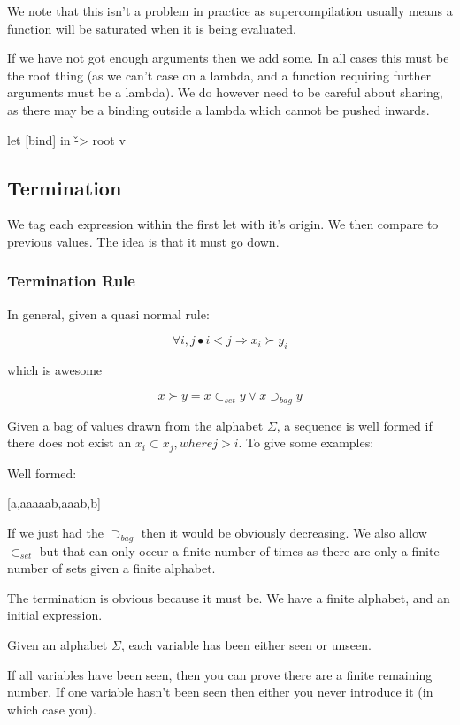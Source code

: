 \documentclass{sigplanconf}
\begin{document}
We note that this isn't a problem in practice as supercompilation usually means a function will be saturated when it is being evaluated.


If we have not got enough arguments then we add some. In all cases this must be the root thing (as we can't case on a lambda, and a function requiring further arguments must be a lambda). We do however need to be careful about sharing, as there may be a binding outside a lambda which cannot be pushed inwards.

\begin{code}
let [bind]
in \v -> root v
\end{code}


\subsection{Termination}
\label{sec:term}

We tag each expression within the first let with it's origin. We then compare to previous values. The idea is that it must go down.

\subsubsection{Termination Rule}

In general, given a quasi normal rule:

\[
\forall i, j \bullet i < j \Rightarrow x_i \succ y_i
\]

which is awesome

\[
x \succ y = x \subset_{set} y \vee x \supset_{bag} y
\]

Given a bag of values drawn from the alphabet $\Sigma$, a sequence is well formed if there does not exist an $x_i \subset x_j, where j > i$. To give some examples:

Well formed:

[a,aaaaab,aaab,b]

If we just had the $\supset_{bag}$ then it would be obviously decreasing. We also allow $\subset_{set}$ but that can only occur a finite number of times as there are only a finite number of sets given a finite alphabet.

The termination is obvious because it must be. We have a finite alphabet, and an initial expression.

Given an alphabet $\Sigma$, each variable has been either seen or unseen.

If all variables have been seen, then you can prove there are a finite remaining number. If one variable hasn't been seen then either you never introduce it (in which case you).
\end{document}
